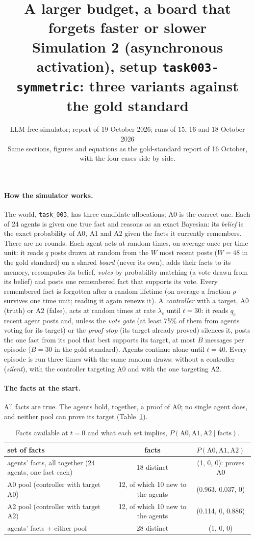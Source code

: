 \documentclass[10pt,a4paper]{article}
\title{\vspace{-1.2cm}\textbf{A larger budget, a board that forgets faster or slower}\\[2pt]
\large Simulation 2 (asynchronous activation), setup \texttt{task003-symmetric}: three variants against the gold standard}
\author{LLM-free simulator; report of 19 October 2026; runs of 15, 16 and 18 October 2026\\
\small Same sections, figures and equations as the gold-standard report of 16 October, with the four cases side by side.}
\date{}
\begin{document}
\maketitle
\vspace{-1cm}

\paragraph{How the simulator works.} The world, \texttt{task\_003}, has three candidate allocations; A0 is the
correct one. Each of 24 agents is given one true fact and reasons as an exact Bayesian: its \emph{belief} is the
exact probability of A0, A1 and A2 given the facts it currently remembers. There are no rounds. Each agent acts
at random times, on average once per time unit: it reads $q$ posts drawn at random from the $W$ most recent posts ($W = 48$ in the gold standard)
on a shared \emph{board} (never its own), adds their facts to its memory, recomputes its belief, \emph{votes} by
probability matching (a vote drawn from its belief) and posts one remembered fact that supports its vote. Every
remembered fact is forgotten after a random lifetime (on average a fraction $\rho$ survives one time unit; reading
it again renews it). A \emph{controller} with a target, A0 (truth) or A2 (false), acts at random times at rate
$\lambda_c$ until $t = 30$: it reads $q_c$ recent agent posts and, unless the \emph{vote gate} (at least 75\% of
them from agents voting for its target) or the \emph{proof stop} (its target already proved) silences it, posts
the one fact from its pool that best supports its target, at most $B$ messages per episode ($B = 30$ in the gold standard). Agents continue
alone until $t = 40$. Every episode is run three times with the same random draws: without a controller
(\emph{silent}), with the controller targeting A0 and with the one targeting A2.

\paragraph{The facts at the start.} All facts are true. The agents hold, together, a proof of A0; no single
agent does, and neither pool can prove its target (Table~\ref{tab:facts}).

\begin{table}[H]
\centering\small
\caption{Facts available at $t = 0$ and what each set implies, $P(\text{A0}, \text{A1}, \text{A2} \mid \text{facts})$.}
\label{tab:facts}
\begin{tabular}{lcc}
\toprule
set of facts & facts & $P(\text{A0}, \text{A1}, \text{A2})$ \\
\midrule
agents' facts, all together (24 agents, one fact each) & 18 distinct & (1, 0, 0): proves A0 \\
A0 pool (controller with target A0) & 12, of which 10 new to the agents & (0.963, 0.037, 0) \\
A2 pool (controller with target A2) & 12, of which 10 new to the agents & (0.114, 0, 0.886) \\
agents' facts + either pool & 28 distinct & (1, 0, 0) \\
\bottomrule
\end{tabular}
\end{table}
\end{document}
